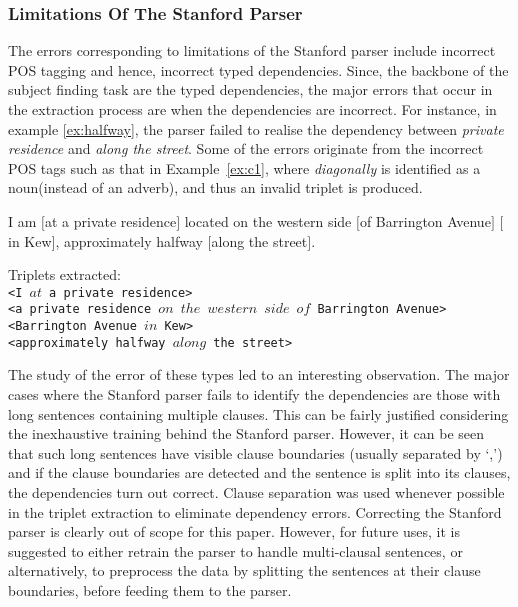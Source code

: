 \documentclass{acm_proc_article-sp}
\begin{document}
\subsubsection{Limitations Of The Stanford Parser}
\label{subsub:stanford}
The errors corresponding to limitations of the Stanford parser include incorrect POS tagging and hence, incorrect typed dependencies. Since, the backbone of the subject finding task are the typed dependencies, the major errors that occur in the extraction process are when the dependencies are incorrect. For instance, in example \ref{ex:halfway}, the parser failed to realise the dependency between \textit{private residence} and \textit{along the street}. Some of the errors originate from the incorrect POS tags such as that in Example~\ref{ex:c1}, where \textit{diagonally} is identified as a noun(instead of an adverb), and thus an invalid triplet is produced.
\begin{example}
\label{ex:halfway}
I am $[$at a private residence$]$ located on the western side $[$of Barrington Avenue$]$ $[$in Kew$]$, approximately halfway $[$along the street$]$.
\end{example}
Triplets extracted:\\
\texttt{<I $at$ a private residence>}\\
\texttt{<a private residence  $on$  $the$ $western$ $side$ $of$ Barrington Avenue>}\\
\texttt{<Barrington Avenue $in$ Kew>}\\
\texttt{<approximately halfway $along$ the street>}

The study of the error of these types led to an interesting observation. The major cases where the Stanford parser fails to identify the dependencies are those with long sentences containing multiple clauses. This can be fairly justified considering the inexhaustive training behind the Stanford parser. However, it can be seen that such long sentences have visible clause boundaries (usually separated by `,') and if the clause boundaries are detected and the sentence is split into its clauses, the dependencies turn out correct. Clause separation was used whenever possible in the triplet extraction to eliminate dependency errors. Correcting the Stanford parser is clearly out of scope for this paper. However, for future uses, it is suggested to either retrain the parser to handle multi-clausal sentences, or alternatively, to preprocess the data by splitting the sentences at their clause boundaries, before feeding them to the parser.
\end{document}
